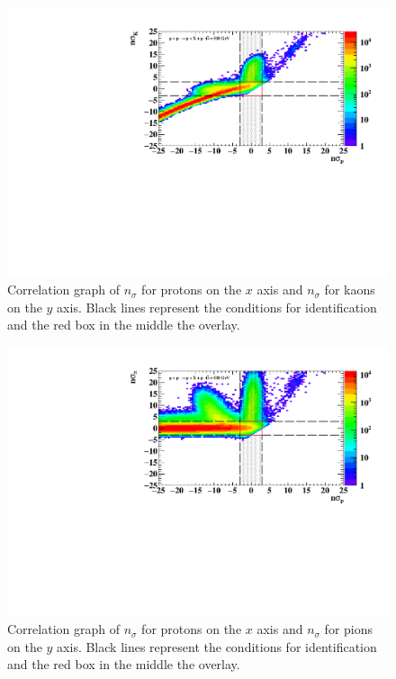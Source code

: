 \FloatBarrier
\begin{figure}[ht]
    \centering
    \includegraphics[width=1\textwidth]{figures/hNSigmaPKcorr.pdf}
    \caption[Correlation graph of $n\sigma_{p}$ and $n\sigma_{K}$ of measured particles]{Correlation graph of $n_{\sigma}$ for protons on the $x$ axis and $n_{\sigma}$ for kaons on the $y$ axis. Black lines represent the conditions for identification and the red box in the middle the overlay.}
    \label{a4}
\end{figure}
\FloatBarrier

\FloatBarrier
\begin{figure}[ht]
    \centering
    \includegraphics[width=1\textwidth]{figures/hNSigmaPPicorr.pdf}
    \caption[Correlation graph of $n\sigma_{p}$ and $n\sigma_{\pi}$ of measured particles]{Correlation graph of $n_{\sigma}$ for protons on the $x$ axis and $n_{\sigma}$ for pions on the $y$ axis. Black lines represent the conditions for identification and the red box in the middle the overlay.}
    \label{a4}
\end{figure}
\FloatBarrier
